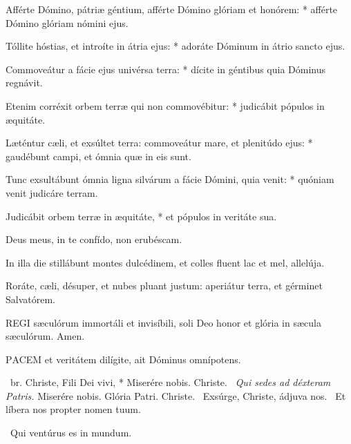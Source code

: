 Afférte Dómino, pátriæ géntium, afférte Dómino glóriam et honórem: * afférte Dómino glóriam nómini ejus.

Tóllite hóstias, et introíte in átria ejus: * adoráte Dóminum in átrio sancto ejus.

Commoveátur a fácie ejus univérsa terra: * dícite in géntibus quia Dóminus regnávit.

Etenim corréxit orbem terræ qui non commovébitur: * judicábit pópulos in æquitáte.

Læténtur cæli, et exsúltet terra: commoveátur mare, et plenitúdo ejus: * gaudébunt campi, et ómnia quæ in eis sunt.

Tunc exsultábunt ómnia ligna silvárum a fácie Dómini, quia venit: * quóniam venit judicáre terram.

Judicábit orbem terræ in æquitáte, * et pópulos in veritáte sua.


  Deus meus, in te confído, non erubéscam.


  In illa die stillábunt montes dulcédinem, et colles fluent lac et mel, allelúja.

  Roráte, cæli, désuper, et nubes pluant justum: aperiátur terra, et gérminet Salvatórem.



\lettrine[lines=2]{R}{EGI} sæculórum immortáli et invisíbili, soli Deo honor et glória in sæcula sæculórum. Amen.



\lettrine[lines=2]{P}{ACEM} et veritátem dilígite, ait Dóminus omnípotens.

\R\ br. Christe, Fili Dei vivi, * Miserére nobis. Christe. \V\ \textit{Qui sedes ad déxteram Patris.} Miserére nobis. Glória Patri. Christe. \V\ Exsúrge, Christe, ádjuva nos. \R\ Et líbera nos propter nomen tuum.

 \V\ Qui ventúrus es in mundum.

